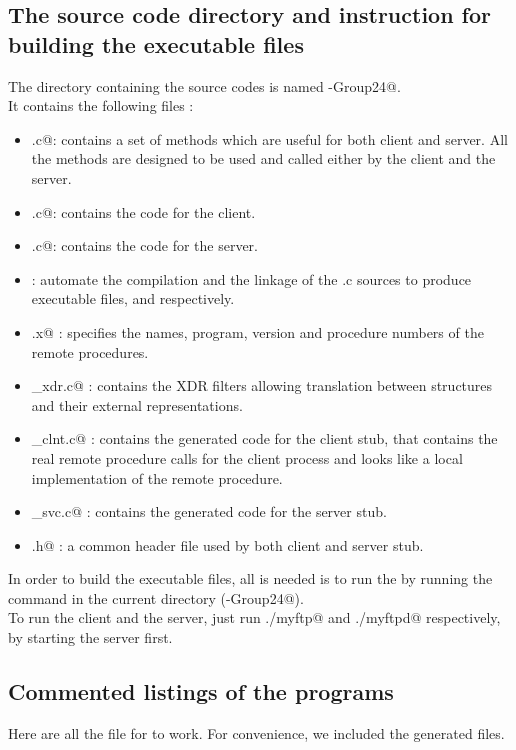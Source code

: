 \documentclass{article}
\begin{document}
\subsection{The source code directory and instruction for building the executable files}
The directory containing the source codes is named -Group24@.  \\
It contains the following files : 
\begin{itemize}
\item \verb@utils.c@: contains a set of methods which are useful for both client and server. All the methods are designed to be used and called either by the client and the server. 
\item \verb@myftp.c@: contains the code for the client.
\item \verb@myftpd.c@: contains the code for the server.
\item \verb@Makefile@: automate the compilation and the linkage of the .c sources to produce executable files, \verb@myftp@ and \verb@myftpd@ respectively.
\item \verb@rpspec.x@ : specifies the names, program, version and procedure numbers of the remote procedures.
\item \verb@rpspec_xdr.c@ : contains the XDR filters allowing translation between structures and their external representations.
\item \verb@rpspec_clnt.c@ : contains the generated code for the client stub, that contains the real remote procedure calls for the client process and looks like a local implementation of the remote procedure.
\item \verb@rpspec_svc.c@ : contains the generated code for the server stub.
\item \verb@rpspec.h@ : a common header file used by both client and server stub.
\end{itemize}
In order to build the executable files, all is needed is to run the \verb@Makefile@ by running the \verb@make@ command in the current directory (-Group24@).\\

To run the client and the server, just run \verb@./myftp@ and \verb@./myftpd@ respectively, by starting the server first.
\subsection{Commented listings of the programs}
Here are all the file for \verb@myftp@ to work. For convenience, we included the generated files.
\end{document}
